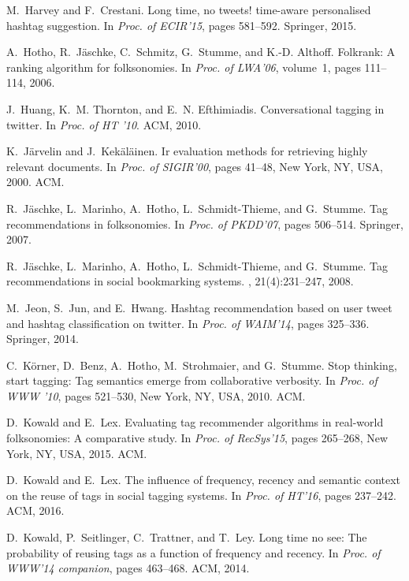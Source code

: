 \documentclass{sig-alternate-05-2015}
\begin{document}
\begin{thebibliography}{10}
M.~Harvey and F.~Crestani.
\newblock Long time, no tweets! time-aware personalised hashtag suggestion.
\newblock In {\em Proc. of ECIR'15}, pages 581--592. Springer, 2015.

A.~Hotho, R.~J{\"a}schke, C.~Schmitz, G.~Stumme, and K.-D. Althoff.
\newblock Folkrank: A ranking algorithm for folksonomies.
\newblock In {\em Proc. of LWA'06}, volume~1, pages 111--114, 2006.

J.~Huang, K.~M. Thornton, and E.~N. Efthimiadis.
\newblock Conversational tagging in twitter.
\newblock In {\em Proc. of HT '10}. ACM, 2010.

K.~J\"{a}rvelin and J.~Kek\"{a}l\"{a}inen.
\newblock Ir evaluation methods for retrieving highly relevant documents.
\newblock In {\em Proc. of SIGIR'00}, pages 41--48, New York, NY, USA, 2000.
  ACM.

R.~J{\"a}schke, L.~Marinho, A.~Hotho, L.~Schmidt-Thieme, and G.~Stumme.
\newblock Tag recommendations in folksonomies.
\newblock In {\em Proc. of PKDD'07}, pages 506--514. Springer, 2007.

R.~J{\"a}schke, L.~Marinho, A.~Hotho, L.~Schmidt-Thieme, and G.~Stumme.
\newblock Tag recommendations in social bookmarking systems.
, 21(4):231--247, 2008.

M.~Jeon, S.~Jun, and E.~Hwang.
\newblock Hashtag recommendation based on user tweet and hashtag classification
  on twitter.
\newblock In {\em Proc. of WAIM'14}, pages 325--336. Springer, 2014.

C.~K\"{o}rner, D.~Benz, A.~Hotho, M.~Strohmaier, and G.~Stumme.
\newblock Stop thinking, start tagging: Tag semantics emerge from collaborative
  verbosity.
\newblock In {\em Proc. of WWW '10}, pages 521--530, New York, NY, USA, 2010.
  ACM.

D.~Kowald and E.~Lex.
\newblock Evaluating tag recommender algorithms in real-world folksonomies: A
  comparative study.
\newblock In {\em Proc. of RecSys'15}, pages 265--268, New York, NY, USA, 2015.
  ACM.

D.~Kowald and E.~Lex.
\newblock The influence of frequency, recency and semantic context on the reuse
  of tags in social tagging systems.
\newblock In {\em Proc. of HT'16}, pages 237--242. ACM, 2016.

D.~Kowald, P.~Seitlinger, C.~Trattner, and T.~Ley.
\newblock Long time no see: The probability of reusing tags as a function of
  frequency and recency.
\newblock In {\em Proc. of WWW'14 companion}, pages 463--468. ACM, 2014.


\end{thebibliography}
\end{document}
